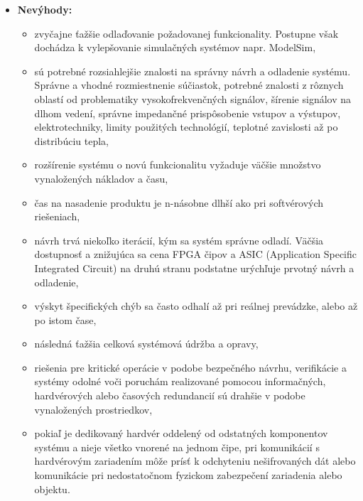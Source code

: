 \documentclass[12pt,a4wide,oneside,openright]{report}
\begin{document}
\begin{itemize}
\begin{itemize}

		\end{itemize}
		\item \textbf{Nevýhody:}
		\begin{itemize}
			\item zvyčajne ťažšie odlaďovanie požadovanej funkcionality. Postupne však dochádza k vylepšovanie simulačných systémov napr. ModelSim,
			\item sú potrebné rozsiahlejšie znalosti na správny návrh a odladenie systému. Správne a vhodné rozmiestnenie súčiastok, potrebné znalosti z rôznych oblastí od problematiky vysokofrekvenčných signálov, šírenie signálov na dlhom vedení, správne impedančné prispôsobenie vstupov a výstupov, elektrotechniky, limity použitých technológií, teplotné zavislosti až po distribúciu tepla,
			\item rozšírenie systému o novú funkcionalitu vyžaduje väčšie množstvo vynaložených nákladov a času,
			\item čas na nasadenie produktu je n-násobne dlhší ako pri softvérových riešeniach,
			\item návrh trvá niekoľko iterácií, kým sa systém správne odladí. Väčšia dostupnosť a znižujúca sa cena FPGA čipov a ASIC (Application Specific Integrated Circuit) na druhú stranu podstatne urýchľuje prvotný návrh a odladenie,
			\item výskyt špecifických chýb sa často odhalí až pri reálnej prevádzke, alebo až po istom čase,
			\item následná ťažšia celková systémová údržba a opravy,
			\item riešenia pre kritické operácie v podobe bezpečného návrhu, verifikácie a systémy odolné voči poruchám realizované pomocou informačných, hardvérových alebo časových redundancií sú drahšie v podobe vynaložených prostriedkov,
			\item pokiaľ je dedikovaný hardvér oddelený od odstatných komponentov systému a nieje všetko vnorené na jednom čipe, pri komunikácií s hardvérovým zariadením môže prísť k odchyteniu nešifrovaných dát alebo komunikácie pri nedostatočnom fyzickom zabezpečení zariadenia alebo objektu.
			
		\end{itemize}
	\end{itemize}
\end{document}

